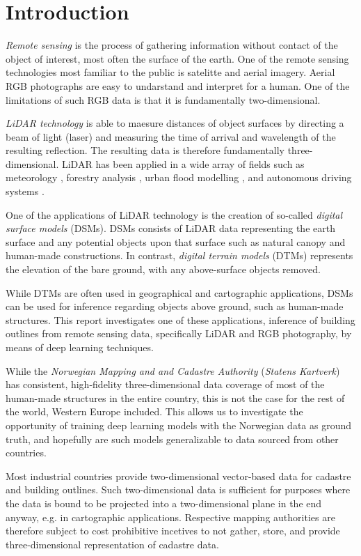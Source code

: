 \section*{Introduction}

\textit{Remote sensing} is the process of gathering information without contact of the object of interest, most often the surface of the earth.
One of the remote sensing technologies most familiar to the public is satelitte and aerial imagery.
Aerial RGB photographs are easy to undarstand and interpret for a human.
One of the limitations of such RGB data is that it is fundamentally two-dimensional.

\textit{LiDAR technology} is able to maesure distances of object surfaces by directing a beam of light (laser) and measuring the time of arrival and wavelength of the resulting reflection.
The resulting data is therefore fundamentally three-dimensional.
LiDAR has been applied in a wide array of fields such as meteorology \cite{lidar_meteorology_1966}, forestry analysis \cite{lidar_forestry_2000}, urban flood modelling \cite{lidar_flood_2013}, and autonomous driving systems \cite{lidar_self_driving_2018}.

One of the applications of LiDAR technology is the creation of so-called \textit{digital surface models} (DSMs).
DSMs consists of LiDAR data representing the earth surface and any potential objects upon that surface such as natural canopy and human-made constructions.
In contrast, \textit{digital terrain models} (DTMs) represents the elevation of the bare ground, with any above-surface objects removed.

While DTMs are often used in geographical and cartographic applications, DSMs can be used for inference regarding objects above ground, such as human-made structures.
This report investigates one of these applications, inference of building outlines from remote sensing data, specifically LiDAR and RGB photography, by means of deep learning techniques.

While the \textit{Norwegian Mapping and and Cadastre Authority} (\textit{Statens Kartverk}) has consistent, high-fidelity three-dimensional data coverage of most of the human-made structures in the entire country, this is not the case for the rest of the world, Western Europe included.
This allows us to investigate the opportunity of training deep learning models with the Norwegian data as ground truth, and hopefully are such models generalizable to data sourced from other countries.

Most industrial countries provide two-dimensional vector-based data for cadastre and building outlines.
Such two-dimensional data is sufficient for purposes where the data is bound to be projected into a two-dimensional plane in the end anyway, e.g. in cartographic applications.
Respective mapping authorities are therefore subject to cost prohibitive incetives to not gather, store, and provide three-dimensional representation of cadastre data.

